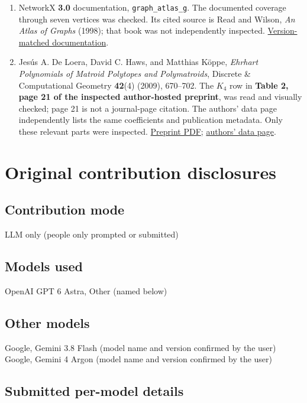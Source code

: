 \documentclass{article}
\begin{document}
\begin{enumerate}
\item
  NetworkX \textbf{3.0} documentation, \texttt{graph\_atlas\_g}. The documented coverage through seven vertices was checked. Its cited source is Read and Wilson, \emph{An Atlas of Graphs} (1998); that book was not independently inspected. \href{https://networkx.org/documentation/networkx-3.0/reference/generated/networkx.generators.atlas.graph_atlas_g.html}{Version-matched documentation}.
\item
  Jesús A. De Loera, David C. Haws, and Matthias Köppe, \emph{Ehrhart Polynomials of Matroid Polytopes and Polymatroids}, Discrete \& Computational Geometry \textbf{42}(4) (2009), 670--702. The \(K_4\) row in \textbf{Table 2, page 21 of the inspected author-hosted preprint}, was read and visually checked; page 21 is not a journal-page citation. The authors' data page independently lists the same coefficients and publication metadata. Only these relevant parts were inspected. \href{https://www.math.ucdavis.edu/~deloera/researchsummary/Matroidpolys.pdf}{Preprint PDF}; \href{https://math.ucdavis.edu/~mkoeppe/art/Matroids/}{authors' data page}.
\end{enumerate}

\section{Original contribution disclosures}

\subsection{Contribution mode}

LLM only (people only prompted or submitted)

\subsection{Models used}

OpenAI GPT 6 Astra, Other (named below)

\subsection{Other models}

Google, Gemini 3.8 Flash (model name and version confirmed by the user) Google, Gemini 4 Argon (model name and version confirmed by the user)

\subsection{Submitted per-model details}
\end{document}
